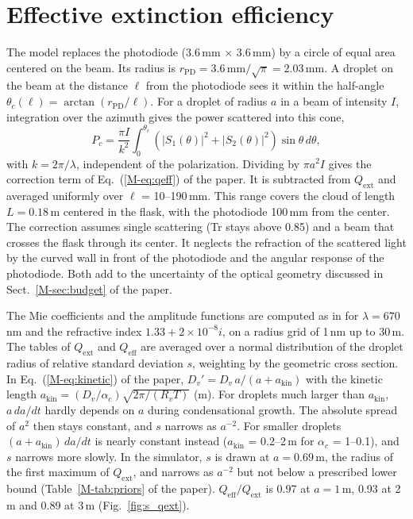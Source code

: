 \documentclass[12pt]{article}
\begin{document}
\section{Effective extinction efficiency}
\label{sec:s-qeff}
The model replaces the photodiode (3.6\,mm $\times$ 3.6\,mm) by a circle of equal area centered on the beam.
Its radius is $r_\mathrm{PD} = 3.6\,\mathrm{mm}/\sqrt{\pi} = 2.03$\,mm. A droplet on the beam at
the distance $\ell$ from the photodiode sees it within the half-angle $\theta_c(\ell) =
\arctan(r_\mathrm{PD}/\ell)$.
For a droplet of radius $a$ in a beam of intensity $I$, integration over the azimuth \citep[Eqs.~4.74 and
4.77]{bohren1983absorption} gives the power scattered into this cone,
\begin{equation}
P_c = \frac{\pi I}{k^2}\int_0^{\theta_c}\left(|S_1(\theta)|^2 + |S_2(\theta)|^2\right)\sin\theta\,d\theta ,
\end{equation}
with $k = 2\pi/\lambda$, independent of the polarization. Dividing by $\pi a^2 I$ gives the
correction term of Eq.~(\ref{M-eq:qeff}) of the paper.
It is subtracted from $Q_\mathrm{ext}$ and averaged uniformly over $\ell$ = 10--190\,mm. This range covers
the cloud of length $L = 0.18$\,m centered in the flask, with the photodiode 100\,mm from the center.
The correction assumes single scattering (Tr stays above 0.85) and a beam that crosses the flask
through its center.
It neglects the refraction of the scattered light by the curved wall in front of the photodiode and
the angular response of the photodiode.
Both add to the uncertainty of the optical geometry discussed in Sect.~\ref{M-sec:budget} of the paper.

The Mie coefficients and the amplitude functions are computed as in \citet[Eqs.~4.74 and
4.88]{bohren1983absorption} for
$\lambda = 670$\,nm and the refractive index $1.33 + 2\times10^{-8}i$, on a radius grid of 1\,nm up to
30\,\textmu m. The tables of $Q_\mathrm{ext}$ and $Q_\mathrm{eff}$ are averaged over a normal
distribution of the droplet radius of relative standard deviation $s$, weighting by the geometric
cross section.
In Eq.~(\ref{M-eq:kinetic}) of the paper, $D_v' = D_v\,a/(a + a_\mathrm{kin})$ with the kinetic
length $a_\mathrm{kin} = (D_v/\alpha_c)\sqrt{2\pi/(R_v T)}$ (m).
For droplets much larger than $a_\mathrm{kin}$, $a\,da/dt$ hardly depends on $a$ during condensational
growth.
The absolute spread of $a^2$ then stays constant, and $s$ narrows as $a^{-2}$.
For smaller droplets $(a + a_\mathrm{kin})\,da/dt$ is nearly constant instead
($a_\mathrm{kin}$ = 0.2--2\,\textmu m for $\alpha_c$ = 1--0.1), and $s$ narrows more slowly.
In the simulator, $s$ is drawn at $a = 0.69$\,\textmu m, the radius of the first maximum of
$Q_\mathrm{ext}$, and narrows as $a^{-2}$ but not below a prescribed lower bound
(Table~\ref{M-tab:priors} of the paper).
$Q_\mathrm{eff}/Q_\mathrm{ext}$ is 0.97 at $a = 1$\,\textmu m, 0.93 at
2\,\textmu m and 0.89 at 3\,\textmu m (Fig.~\ref{fig:s_qext}).
\end{document}
